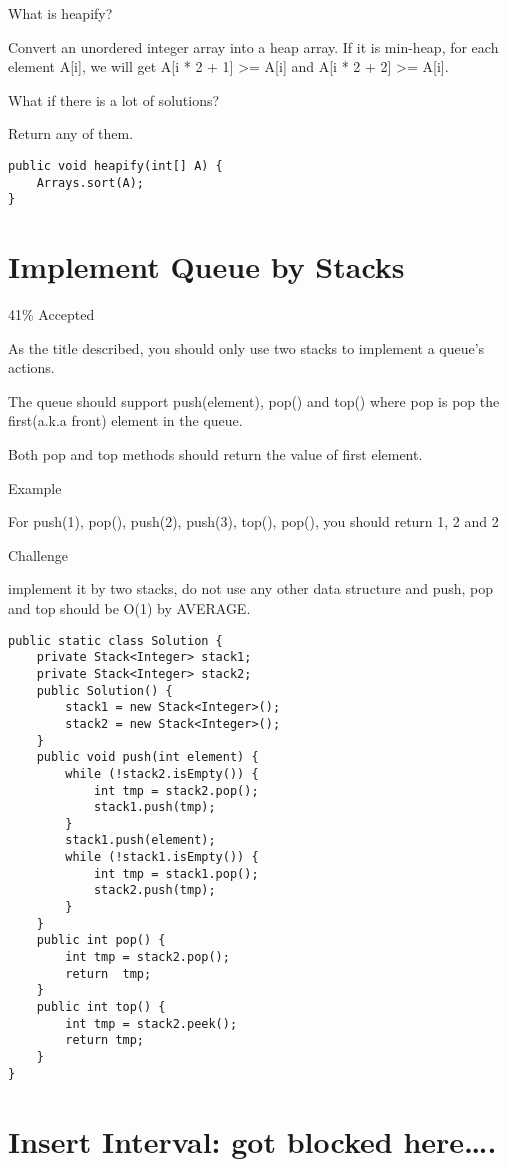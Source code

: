 \documentclass[9pt, b5paaper]{book}
\begin{document}
What is heapify?

Convert an unordered integer array into a heap array. If it is min-heap, for each element A[i], we will get A[i * 2 + 1] >= A[i] and A[i * 2 + 2] >= A[i].

What if there is a lot of solutions?

Return any of them.
\begin{verbatim}
public void heapify(int[] A) {
    Arrays.sort(A);
}
\end{verbatim}
\section{Implement Queue by Stacks}
\label{sec-5-33}

41\% Accepted

As the title described, you should only use two stacks to implement a queue's actions.

The queue should support push(element), pop() and top() where pop is pop the first(a.k.a front) element in the queue.

Both pop and top methods should return the value of first element.

Example

For push(1), pop(), push(2), push(3), top(), pop(), you should return 1, 2 and 2

Challenge

implement it by two stacks, do not use any other data structure and
push, pop and top should be O(1) by AVERAGE.
\begin{verbatim}
public static class Solution {
    private Stack<Integer> stack1;
    private Stack<Integer> stack2;
    public Solution() {
        stack1 = new Stack<Integer>();
        stack2 = new Stack<Integer>();
    }
    public void push(int element) {
        while (!stack2.isEmpty()) {
            int tmp = stack2.pop();
            stack1.push(tmp);
        }
        stack1.push(element);
        while (!stack1.isEmpty()) {
            int tmp = stack1.pop();
            stack2.push(tmp);
        }
    }
    public int pop() {
        int tmp = stack2.pop();
        return  tmp;
    }
    public int top() {
        int tmp = stack2.peek();
        return tmp;
    }
}
\end{verbatim}
\section{Insert Interval: got blocked here\ldots{}.}
\label{sec-5-34}
\end{document}

